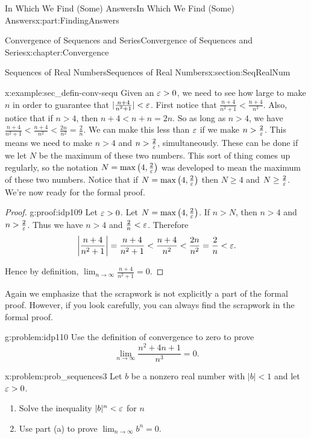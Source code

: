 \begin{partptx}{In Which We Find (Some) Answers}{}{In Which We Find (Some) Answers}{}{}{x:part:FindingAnswers}
\begin{chapterptx}{Convergence of Sequences and Series}{}{Convergence of Sequences and Series}{}{}{x:chapter:Convergence}
\begin{sectionptx}{Sequences of Real Numbers}{}{Sequences of Real Numbers}{}{}{x:section:SeqRealNum}
\begin{example}{}{x:example:sec_defin-conv-sequ}
				Given an \(\varepsilon>0\), we need to see how large to make \(n\) in order to guarantee that \(|\frac{n+4}{n^2+1}|< \varepsilon\). First notice that \(\frac{n+4}{n^2+1}\lt \frac{n+4}{n^2}\). Also, notice that if \(n>4\), then \(n+4\lt n+n=2n\). So as long as \(n>4\), we have \(\frac{n+4}{n^2+1}\lt \frac{n+4}{n^2}\lt \frac{2n}{n^2}=\frac{2}{n}\). We can make this less than \(\varepsilon\) if we make \(n>\frac{2}{\varepsilon}\). This means we need to make \(n>4\) and \(n>\frac{2}{\varepsilon}\), simultaneously. These can be done if we let \(N\) be the maximum of these two numbers. This sort of thing comes up regularly, so the notation \(N=\max\left(4,\frac{2}{\varepsilon}\right)\) was developed to mean the maximum of these two numbers. Notice that if \(N=\max\left(4, \frac{2}{\varepsilon}\right)\) then \(N\geq 4\) and \(N\geq\frac{2}{\varepsilon}\). We're now ready for the formal proof.%
			\end{example}
			\begin{proof}{}{g:proof:idp109}
				Let \(\varepsilon>0\). Let \(N=\max\left(4,\frac{2}{\varepsilon}\right)\). If \(n>N\), then \(n>4\) and \(n>\frac{2}{\varepsilon}\). Thus we have \(n>4\) and \(\frac{2}{n}< \varepsilon\). Therefore%
				\begin{equation*}
					\left|\frac{n+4}{n^2+1}\right|=\frac{n+4}{n^2+1}< \frac{n+4}{n^2}< \frac{2n}{n^2}= \frac{2}{n}< \varepsilon\text{.}
				\end{equation*}
				\par
				Hence by definition, \(\displaystyle\lim_{n\rightarrow\infty}\frac{n+4}{n^2+1}=0\).%
			\end{proof}
			Again we emphasize that the scrapwork is not \alert{explicitly} a part of the formal proof.  However, if you look carefully, you can always find the scrapwork in the formal proof.%
			\begin{problem}{}{g:problem:idp110}%
				 Use the definition of convergence to zero to prove%
				\begin{equation*}
					\lim_{n\rightarrow\infty}\frac{n^2+4n+1}{n^3}=0.{}
				\end{equation*}
			\end{problem}
			\begin{problem}{}{x:problem:prob_sequences3}%
				Let \(b\) be a nonzero real number with \(|b|\lt 1\) and let \(\varepsilon>0\).%
				\begin{enumerate}[font=\bfseries,label=(\alph*),ref=\alph*]
					\item{}Solve the inequality \(|b|^n< \varepsilon\) for \(n\)%
					\item{}Use part (a) to prove \(\lim_{n\rightarrow\infty}b^n=0\).%

\end{enumerate}
\end{problem}
\end{sectionptx}
\end{chapterptx}
\end{partptx}
